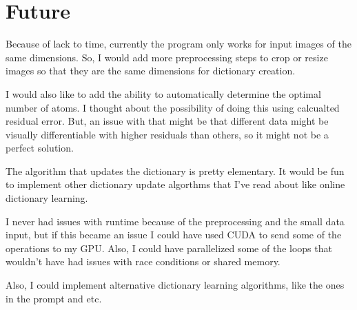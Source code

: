 \documentclass[11pt]{article}
\begin{document}
\section{Future}

Because of lack to time, currently the program only works for input images of the same dimensions. So, I would add more preprocessing steps to crop or resize images so that they are the same dimensions for dictionary creation. 

I would also like to add the ability to automatically determine the optimal number of atoms. I thought about the possibility of doing this using calcualted residual error. But, an issue with that might be that different data might be visually differentiable with higher residuals than others, so it might not be a perfect solution.

The algorithm that updates the dictionary is pretty elementary. It would be fun to implement other dictionary update algorthms that I've read about like online dictionary learning. 

I never had issues with runtime because of the preprocessing and the small data input, but if this became an issue I could have used CUDA to send some of the operations to my GPU. Also, I could have parallelized some of the loops that wouldn't have had issues with race conditions or shared memory. 

Also, I could implement alternative dictionary learning algorithms, like the ones in the prompt and etc.
\end{document}
